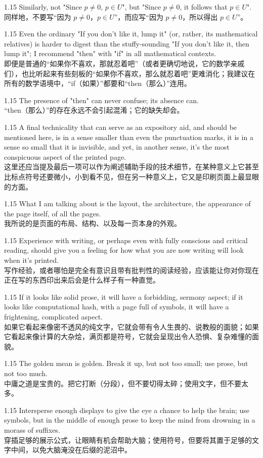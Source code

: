\documentclass[12pt,a4paper]{article}
\newcommand{\bilingual}[2]{
    \begin{spacing}{1.15} %
        \noindent \normalsize #1 \\[-0.5ex] %
        \small \textcolor{blue!70!black}{#2} %
    \end{spacing}
    \vspace{0.8em} %
}
\begin{document}
\bilingual{Similarly, not "Since $p\ne0$, $p\in U$", but "Since $p\ne0$, it follows that $p\in U$".}
{同样地，不要写“因为 $p\ne0$，$p\in U$”，而应写“因为 $p\ne0$，所以得出 $p\in U$”。} %

\bilingual{Even the ordinary "If you don't like it, lump it" (or, rather, its mathematical relatives) is harder to digest than the stuffy-sounding "If you don't like it, then lump it"; I recommend "then" with "if" in all mathematical contexts.}
{即便是普通的“如果你不喜欢，那就忍着吧”（或者更确切地说，它的数学亲戚们），也比听起来有些刻板的“如果你不喜欢，那么就忍着吧”更难消化；我建议在所有的数学语境中，“if（如果）”都要和“then（那么）”连用。} %

\bilingual{The presence of "then" can never confuse; its absence can.}
{“then（那么）”的存在永远不会引起混淆；它的缺失却会。} %

\bilingual{A final technicality that can serve as an expository aid, and should be mentioned here, is in a sense smaller than even the punctuation marks, it is in a sense so small that it is invisible, and yet, in another sense, it's the most conspicuous aspect of the printed page.}
{这里还应当提及最后一项可以作为阐述辅助手段的技术细节，在某种意义上它甚至比标点符号还要微小，小到看不见，但在另一种意义上，它又是印刷页面上最显眼的方面。} %

\bilingual{What I am talking about is the layout, the architecture, the appearance of the page itself, of all the pages.}
{我所说的是页面的布局、结构、以及每一页本身的外观。} %

\bilingual{Experience with writing, or perhaps even with fully conscious and critical reading, should give you a feeling for how what you are now writing will look when it's printed.}
{写作经验，或者哪怕是完全有意识且带有批判性的阅读经验，应该能让你对你现在正在写的东西印出来后会是什么样子有一种直觉。} %

\bilingual{If it looks like solid prose, it will have a forbidding, sermony aspect; if it looks like computational hash, with a page full of symbols, it will have a frightening, complicated aspect.}
{如果它看起来像密不透风的纯文字，它就会带有令人生畏的、说教般的面貌；如果它看起来像计算的大杂烩，满页都是符号，它就会呈现出令人恐惧、复杂难懂的面貌。} %

\bilingual{The golden mean is golden. Break it up, but not too small; use prose, but not too much.}
{中庸之道是宝贵的。把它打断（分段），但不要切得太碎；使用文字，但不要太多。} %

\bilingual{Intersperse enough displays to give the eye a chance to help the brain; use symbols, but in the middle of enough prose to keep the mind from drowning in a morass of suffixes.}
{穿插足够的展示公式，让眼睛有机会帮助大脑；使用符号，但要将其置于足够的文字中间，以免大脑淹没在后缀的泥沼中。} %
\end{document}
